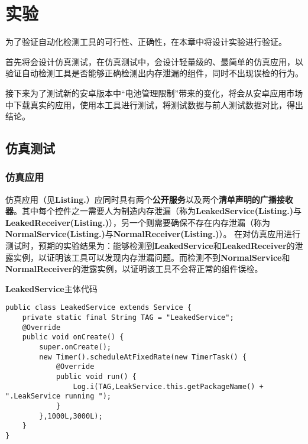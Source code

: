 
\chapter{实验}\label{chapter_experiment}
为了验证自动化检测工具的可行性、正确性，在本章中将设计实验进行验证。

首先将会设计仿真测试，在仿真测试中，会设计轻量级的、最简单的仿真应用，以验证自动检测工具是否能够正确检测出内存泄漏的组件，同时不出现误检的行为。

接下来为了测试新的安卓版本中“电池管理限制”带来的变化，将会从安卓应用市场中下载真实的应用，使用本工具进行测试，将测试数据与前人测试数据对比，得出结论。
\section{仿真测试}

\subsection{仿真应用}

仿真应用（见\textbf{Listing.}\redbf{\ref{code: manifest}}）应同时具有两个\textbf{公开服务}以及两个\textbf{清单声明的广播接收器}。其中每个控件之一需要人为制造内存泄漏（称为\textbf{LeakedService(Listing.\redbf{\ref{code:LeakedService}})}与\textbf{LeakedReceiver(Listing.\redbf{\ref{code:LeakedReceiver}})}），另一个则需要确保不存在内存泄漏（称为\textbf{NormalService(Listing.\redbf{\ref{code:Normal}})}与\textbf{NormalReceiver(Listing.\redbf{\ref{code:Normal}})}）。
在对仿真应用进行测试时，预期的实验结果为：能够检测到\textbf{LeakedService}和\textbf{LeakedReceiver}的泄露实例，以证明该工具可以发现内存泄漏问题。而检测不到\textbf{NormalService}和\textbf{NormalReceiver}的泄露实例，以证明该工具不会将正常的组件误检。


\begin{listing}[htbp]
	\centering
	\caption{\textbf{LeakedService}主体代码}
	\begin{verbatim}
public class LeakedService extends Service {
	private static final String TAG = "LeakedService";
	@Override
	public void onCreate() {
		super.onCreate();
		new Timer().scheduleAtFixedRate(new TimerTask() {
			@Override
			public void run() {
				Log.i(TAG,LeakService.this.getPackageName() + ".LeakService running ");
			}
		},1000L,3000L);
	}
}	
	\end{verbatim}
	\label{code:LeakedService}
\end{listing}

